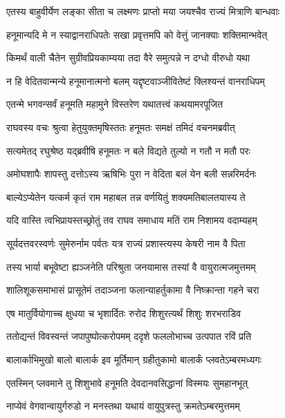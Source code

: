\twolineshloka
{एतस्य बाहुवीर्येण लङ्का सीता च लक्ष्मणः}
{प्राप्तो मया जयश्चैव राज्यं मित्राणि बान्धवाः} %

\twolineshloka
{हनूमान्यदि मे न स्याद्वानराधिपतेः सखा}
{प्रवृत्तमपि को वेत्तुं जानक्याः शक्तिमान्भवेत्} %

\twolineshloka
{किमर्थं वाली चैतेन सुग्रीवप्रियकाम्यया}
{तदा वैरे समुत्पन्ने न दग्धो वीरुधो यथा} %

\twolineshloka
{न हि वेदितवान्मन्ये हनूमानात्मनो बलम्}
{यद्दृष्टवाञ्जीवितेष्टं क्लिश्यन्तं वानराधिपम्} %

\twolineshloka
{एतन्मे भगवन्सर्वं हनूमति महामुने}
{विस्तरेण यथातत्त्वं कथयामरपूजित} %

\twolineshloka
{राघवस्य वचः श्रुत्वा हेतुयुक्तमृषिस्ततः}
{हनूमतः समक्षं तमिदं वचनमब्रवीत्} %

\twolineshloka
{सत्यमेतद् रघुश्रेष्ठ यद्ब्रवीषि हनूमतः}
{न बले विद्यते तुल्यो न गतौ न मतौ परः} %

\twolineshloka
{अमोघशापैः शापस्तु दत्तोऽस्य ऋषिभिः पुरा}
{न वेदिता बलं येन बली सन्नरिमर्दनः} %

\twolineshloka
{बाल्येऽप्येतेन यत्कर्म कृतं राम महाबल}
{तन्न वर्णयितुं शक्यमतिबालतयास्य ते} %

\twolineshloka
{यदि वास्ति त्वभिप्रायस्तच्छ्रोतुं तव राघव}
{समाधाय मतिं राम निशामय वदाम्यहम्} %

\twolineshloka
{सूर्यदत्तवरस्वर्णः सुमेरुर्नाम पर्वतः}
{यत्र राज्यं प्रशास्त्यस्य केषरी नाम वै पिता} %

\twolineshloka
{तस्य भार्या बभूवेष्टा ह्यञ्जनेति परिश्रुता}
{जनयामास तस्यां वै वायुरात्मजमुत्तमम्} %

\twolineshloka
{शालिशूकसमाभासं प्रासूतेमं तदाञ्जना}
{फलान्याहर्तुकामा वै निष्क्रान्ता गहने चरा} %

\twolineshloka
{एष मातुर्वियोगाच्च क्षुधया च भृशार्दितः}
{रुरोद शिशुरत्यर्थं शिशुः शरभराडिव} %

\twolineshloka
{ततोद्यन्तं विवस्वन्तं जपापुष्पोत्करोपमम्}
{ददृशे फललोभाच्च उत्पपात रविं प्रति} %

\twolineshloka
{बालार्काभिमुखो बालो बालार्क इव मूर्तिमान्}
{ग्रहीतुकामो बालार्कं प्लवतेऽम्बरमध्यगः} %

\twolineshloka
{एतस्मिन् प्लवमाने तु शिशुभावे हनूमति}
{देवदानवसिद्धानां विस्मयः सुमहानभूत्} %

\twolineshloka
{नाप्येवं वेगवान्वायुर्गरुडो न मनस्तथा}
{यथायं वायुपुत्रस्तु क्रमतेऽम्बरमुत्तमम्} %

